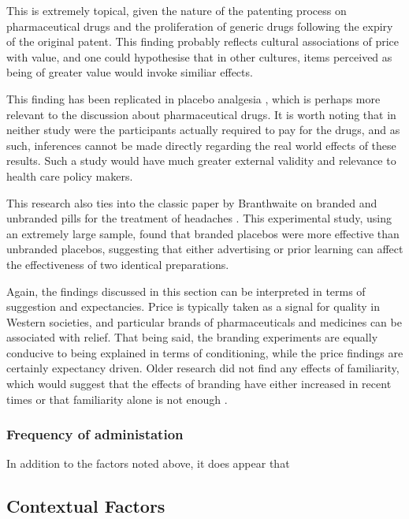 This is extremely topical, given the nature of the patenting process on pharmaceutical drugs and the proliferation of generic drugs following the expiry of the original patent. This finding probably reflects cultural associations of price with value, and one could hypothesise that in other cultures, items perceived as being of greater value would invoke similiar effects.  

This finding has been replicated in placebo analgesia \cite{Waber2008}, which is perhaps more relevant to the discussion about pharmaceutical drugs. It is worth noting that in neither study were the participants actually required to pay for the drugs, and as such, inferences cannot be made directly regarding the real world effects of these results. Such a study would have much greater external validity and relevance to health care policy makers. 

This research also ties into the classic paper by Branthwaite on branded and unbranded pills for the treatment of headaches \cite{Branthwaite1981}. This experimental study, using an extremely large sample, found that branded placebos were more effective than unbranded placebos, suggesting that either advertising or prior learning can affect the effectiveness of two identical preparations. 

Again, the findings discussed in this section can be interpreted in terms of suggestion and expectancies. Price is typically taken as a signal for quality in Western societies, and particular brands of pharmaceuticals and medicines can be associated with relief. That being said, the branding experiments are equally conducive to being explained in terms of conditioning, while the price findings are certainly expectancy driven. Older research did not find any effects of familiarity, which would suggest that the effects of branding have either increased in recent times or that familiarity alone is not enough \cite{Morris1974}.  

\subsubsection{Frequency of administation}
\label{sec:freq-admin}

In addition to the factors noted above, it does appear that 

\subsection{Contextual Factors}
\label{sec:contextual-factors}



